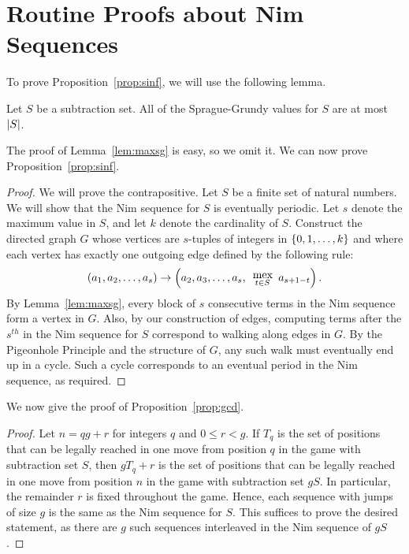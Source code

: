 \documentclass[english,12pt]{article}
\DeclareMathOperator{\SG}{SG}
\begin{document}
\section{Routine Proofs about Nim Sequences}\label{app:nsrp}
To prove Proposition~\ref{prop:sinf}, we will use the following lemma.
\begin{lemma}\label{lem:maxsg}
Let $S$ be a subtraction set.  All of the Sprague-Grundy values for $S$ are at most $\left|S\right|$.
\end{lemma}
The proof of Lemma~\ref{lem:maxsg} is easy, so we omit it.
We can now prove Proposition~\ref{prop:sinf}.
\begin{proof}
We will prove the contrapositive.  Let $S$ be a finite set of natural numbers.  We will show that the Nim sequence for $S$ is eventually periodic.  Let $s$ denote the maximum value in $S$, and let $k$ denote the cardinality of $S$.  Construct the directed graph $G$ whose vertices are $s$-tuples of integers in $\left\{0,1,\ldots, k\right\}$ and where each vertex has exactly one outgoing edge defined by the following rule:
\[
\p{a_1,a_2,\ldots,a_s}\to\p{a_2,a_3,\ldots,a_s,\begin{array}{c}\mex\vspace{-0.1 in}\\\hspace{0in}_{t\in S}\end{array}a_{s+1-t}}.
\]
By Lemma~\ref{lem:maxsg}, every block of $s$ consecutive terms in the Nim sequence form a vertex in $G$.  Also, by our construction of edges, computing terms after the $s^{th}$ in the Nim sequence for $S$ correspond to walking along edges in $G$.  By the Pigeonhole Principle and the structure of $G$, any such walk must eventually end up in a cycle.  Such a cycle corresponds to an eventual period in the Nim sequence, as required.
\end{proof}

We now give the proof of Proposition~\ref{prop:gcd}.
\begin{proof}
Let $n=qg+r$ for integers $q$ and $0\leq r<g$.  If $T_q$ is the set of positions that can be legally reached in one move from position $q$ in the game with subtraction set $S$, then $gT_q+r$ is the set of positions that can be legally reached in one move from position $n$ in the game with subtraction set $gS$.  In particular, the remainder $r$ is fixed throughout the game.  Hence, each sequence with jumps of size $g$ is the same as the Nim sequence for $S$.  This suffices to prove the desired statement, as there are $g$ such sequences interleaved in the Nim sequence of $gS$.
\end{proof}
\end{document}
